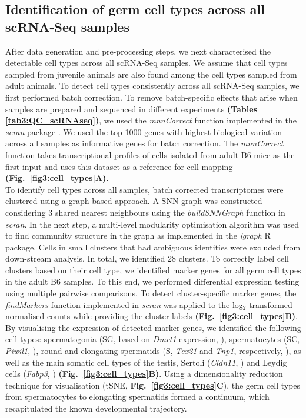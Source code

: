 \newpage

\subsection{Identification of germ cell types across all scRNA-Seq samples}
\label{sec3:clustering}

After data generation and pre-processing steps, we next characterised the detectable cell types across all scRNA-Seq samples. We assume that cell types sampled from juvenile animals are also found among the cell types sampled from adult animals. To detect cell types consistently across all scRNA-Seq samples, we first performed batch correction. To remove batch-specific effects that arise when samples are prepared and sequenced in different experiments \textbf{(Tables \ref{tab3:QC_scRNAseq})}, we used the \emph{mnnCorrect} function implemented in the \emph{scran} package \citep{Haghverdi2018}. We used the top 1000 genes with highest biological variation across all samples as informative genes for batch correction. The \emph{mnnCorrect} function takes transcriptional profiles of cells isolated from adult B6 mice as the first input and uses this dataset as a reference for cell mapping \textbf{(Fig.~\ref{fig3:cell_types}A)}.\\

To identify cell types across all samples, batch corrected transcriptomes were clustered using a graph-based approach. A \gls{SNN} graph \citep{Xu2015} was constructed considering 3 shared nearest neighbours using the \emph{buildSNNGraph} function in \emph{scran}. In the next step, a multi-level modularity optimisation algorithm was used to find community structure in the graph \citep{Blondel2008} as implemented in the \emph{igraph} R package. Cells in small clusters that had ambiguous identities were excluded from down-stream analysis. In total, we identified 28 clusters. To correctly label cell clusters based on their cell type, we identified marker genes for all germ cell types in the adult B6 samples. To this end, we performed differential expression testing using multiple pairwise comparisons. To detect cluster-specific marker genes, the \emph{findMarkers} function implemented in \emph{scran} was applied to the log$_2$-transformed normalised counts while providing the cluster labels \textbf{(Fig.~\ref{fig3:cell_types}B)}. \\

By visualising the expression of detected marker genes, we identified the following cell types: spermatogonia (SG, based on \textit{Dmrt1} expression, \citep{Matson2010}), spermatocytes (SC, \textit{Piwil1}, \citep{Deng2002}), round and elongating spermatids (S, \textit{Tex21} and \textit{Tnp1}, respectively, \citep{Fujii2002}), as well as the main somatic cell types of the testis, Sertoli (\textit{Cldn11}, \citep{Mazaud-Guittot2010}) and Leydig cells (\textit{Fabp3}, \citep{Oresti2013}) \textbf{(Fig.~\ref{fig3:cell_types}B)}. Using a dimensionality reduction technique for visualisation (tSNE, \textbf{Fig.~\ref{fig3:cell_types}C}), the germ cell types from spermatocytes to elongating spermatids formed a continuum, which recapitulated the known developmental trajectory.

